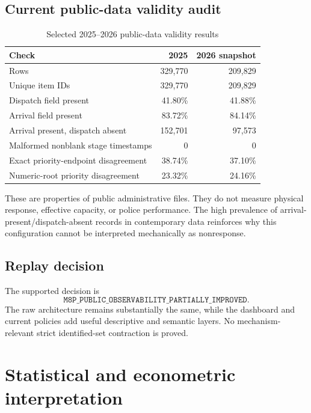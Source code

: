 \documentclass[11pt]{article}
\begin{document}
\subsection{Current public-data validity audit}

\begin{table}[H]
\centering
\caption{Selected 2025--2026 public-data validity results}
\label{tab:currentaudit}
\begin{tabular}{@{}lrr@{}}
\toprule
Check & 2025 & 2026 snapshot \\
\midrule
Rows & 329,770 & 209,829 \\
Unique item IDs & 329,770 & 209,829 \\
Dispatch field present & 41.80\% & 41.88\% \\
Arrival field present & 83.72\% & 84.14\% \\
Arrival present, dispatch absent & 152,701 & 97,573 \\
Malformed nonblank stage timestamps & 0 & 0 \\
Exact priority-endpoint disagreement & 38.74\% & 37.10\% \\
Numeric-root priority disagreement & 23.32\% & 24.16\% \\
\bottomrule
\end{tabular}
\end{table}

These are properties of public administrative files. They do not measure physical response, effective capacity, or police performance. The high prevalence of arrival-present/dispatch-absent records in contemporary data reinforces why this configuration cannot be interpreted mechanically as nonresponse.

\subsection{Replay decision}

The supported decision is
\begin{equation}
\boxed{\texttt{M8P\_PUBLIC\_OBSERVABILITY\_PARTIALLY\_IMPROVED}.}
\end{equation}
The raw architecture remains substantially the same, while the dashboard and current policies add useful descriptive and semantic layers. No mechanism-relevant strict identified-set contraction is proved.

\section{Statistical and econometric interpretation}
\label{sec:inference}
\end{document}

